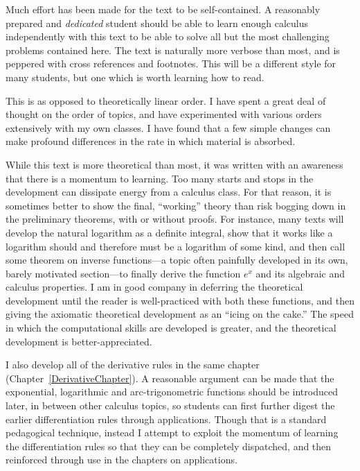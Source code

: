 Much effort has been made for the text to be self-contained. 
A reasonably
prepared and {\it dedicated} student should be able to learn
enough calculus independently with this text to be able to 
solve all but the most challenging problems contained here.
The text is naturally
more verbose than most, and is peppered with cross references
and footnotes.  This will be a different style for many
students, but one which is worth learning how to read.
\bigskip


\bigskip

This is as opposed to theoretically linear order.
I have spent a great deal of thought on the order of topics,
and have experimented with various orders extensively with my
own classes.  I have found that a few simple changes can
make profound differences in the rate in which material is
absorbed.

While this text is more theoretical than most, it was written 
with an awareness that there is a momentum to learning.
Too many starts and stops in the development can dissipate energy
from a calculus class.  For that reason, it is sometimes 
better to show the final, ``working'' theory than risk
bogging down in the preliminary theorems,
with or without proofs.  For instance, many texts will develop the
natural logarithm as a definite integral, show that it works like
a logarithm should and therefore must be a logarithm of some
kind, and then call some theorem on inverse functions---a
topic often painfully developed in its own, barely motivated
section---to finally derive the function $e^x$ and its
algebraic and calculus properties.
I am in good company in deferring
the theoretical development until the reader
is well-practiced with both these functions, and then giving the axiomatic
theoretical development as an ``icing on the cake.'' The speed
in which the computational skills are developed is greater, and
the theoretical development is better-appreciated.  

I also develop all of the derivative rules in the same chapter
(Chapter~\ref{DerivativeChapter}).  A reasonable argument can be made
that the exponential, logarithmic and arc-trigonometric
functions should be introduced later,
in between other calculus topics, so students can first further digest the
earlier differentiation rules through applications.  Though that
is a standard pedagogical technique, instead I attempt
to exploit the momentum of learning the differentiation rules
so that they can be completely dispatched, and then reinforced through
use in the chapters on applications.




